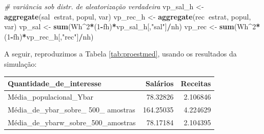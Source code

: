 \documentclass[]{book}
\newenvironment{Shaded}{\begin{snugshade}}{\end{snugshade}}
\newcommand{\KeywordTok}[1]{\textcolor[rgb]{0.13,0.29,0.53}{\textbf{#1}}}
\newcommand{\DataTypeTok}[1]{\textcolor[rgb]{0.13,0.29,0.53}{#1}}
\newcommand{\DecValTok}[1]{\textcolor[rgb]{0.00,0.00,0.81}{#1}}
\newcommand{\StringTok}[1]{\textcolor[rgb]{0.31,0.60,0.02}{#1}}
\newcommand{\CommentTok}[1]{\textcolor[rgb]{0.56,0.35,0.01}{\textit{#1}}}
\newcommand{\OtherTok}[1]{\textcolor[rgb]{0.56,0.35,0.01}{#1}}
\newcommand{\OperatorTok}[1]{\textcolor[rgb]{0.81,0.36,0.00}{\textbf{#1}}}
\newcommand{\NormalTok}[1]{#1}
\theoremstyle{definition}
\theoremstyle{definition}
\theoremstyle{definition}
\theoremstyle{remark}
\begin{document}
\begin{Shaded}
\begin{Highlighting}[]
\CommentTok{# variância sob distr. de aleatorização verdadeira}
\NormalTok{vp_sal_h <-}\StringTok{ }\KeywordTok{aggregate}\NormalTok{(sal}\OperatorTok{~}\NormalTok{estrat, popul, var)}
\NormalTok{vp_rec_h <-}\StringTok{ }\KeywordTok{aggregate}\NormalTok{(rec}\OperatorTok{~}\NormalTok{estrat, popul, var)}
\NormalTok{vp_sal <-}\StringTok{ }\KeywordTok{sum}\NormalTok{(Wh}\OperatorTok{^}\DecValTok{2}\OperatorTok{*}\NormalTok{(}\DecValTok{1}\OperatorTok{-}\NormalTok{fh)}\OperatorTok{*}\NormalTok{vp_sal_h[,}\StringTok{"sal"}\NormalTok{]}\OperatorTok{/}\NormalTok{nh)}
\NormalTok{vp_rec <-}\StringTok{ }\KeywordTok{sum}\NormalTok{(Wh}\OperatorTok{^}\DecValTok{2}\OperatorTok{*}\NormalTok{(}\DecValTok{1}\OperatorTok{-}\NormalTok{fh)}\OperatorTok{*}\NormalTok{vp_rec_h[,}\StringTok{"rec"}\NormalTok{]}\OperatorTok{/}\NormalTok{nh)}
\end{Highlighting}
\end{Shaded}

A seguir, reproduzimos a Tabela \ref{tab:proestmed}, usando os
resultados da simulação:

\begin{Shaded}
\end{Shaded}

\begin{tabular}{lrr}
\toprule
Quantidade\_de\_interesse & Salários & Receitas\\
\midrule
Média\_populacional\_Ybar & 78.32826 & 2.106846\\
Média\_de\_ybar\_sobre\_ 500\_ amostras & 164.25035 & 4.224629\\
Média\_de\_ybarw\_sobre\_500\_amostras & 78.17184 & 2.104395\\
\bottomrule
\end{tabular}
\end{document}
